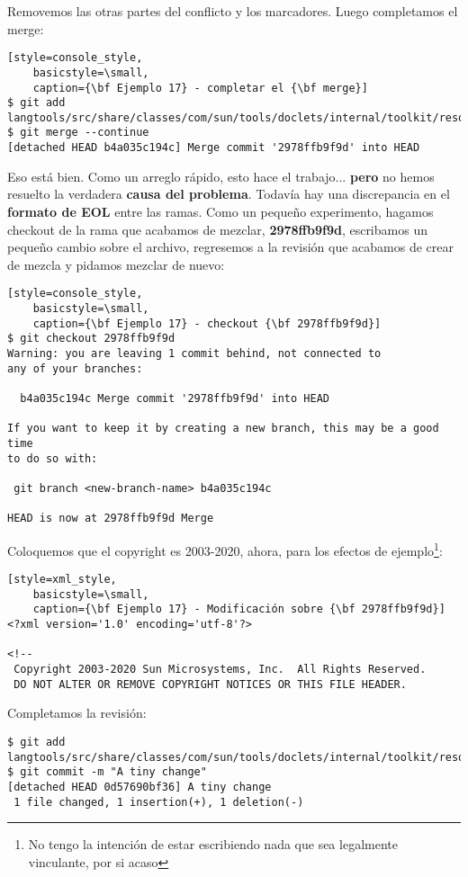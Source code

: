 Removemos las otras partes del conflicto y los marcadores. Luego completamos el merge:

\begin{lstlisting}[style=console_style,
	basicstyle=\small,
	caption={\bf Ejemplo 17} - completar el {\bf merge}]
$ git add langtools/src/share/classes/com/sun/tools/doclets/internal/toolkit/resources/doclet.xml
$ git merge --continue
[detached HEAD b4a035c194c] Merge commit '2978ffb9f9d' into HEAD
\end{lstlisting}

Eso está bien. Como un arreglo rápido, esto hace el trabajo... {\bf pero} no hemos resuelto la verdadera {\bf causa del problema}.
Todavía hay una discrepancia en el {\bf formato de EOL} entre las ramas. Como un pequeño experimento, hagamos checkout de la rama que
acabamos de mezclar, {\bf 2978ffb9f9d}, escribamos un pequeño cambio sobre el archivo, regresemos a la revisión que acabamos de crear de mezcla
y pidamos mezclar de nuevo:

\begin{lstlisting}[style=console_style,
	basicstyle=\small,
	caption={\bf Ejemplo 17} - checkout {\bf 2978ffb9f9d}]
$ git checkout 2978ffb9f9d
Warning: you are leaving 1 commit behind, not connected to
any of your branches:

  b4a035c194c Merge commit '2978ffb9f9d' into HEAD

If you want to keep it by creating a new branch, this may be a good time
to do so with:

 git branch <new-branch-name> b4a035c194c

HEAD is now at 2978ffb9f9d Merge
\end{lstlisting}

Coloquemos que el copyright es 2003-2020, ahora, para los efectos de ejemplo\footnote{No tengo la intención de estar escribiendo
nada que sea legalmente vinculante, por si acaso}:

\begin{lstlisting}[style=xml_style,
	basicstyle=\small,
	caption={\bf Ejemplo 17} - Modificación sobre {\bf 2978ffb9f9d}]
<?xml version='1.0' encoding='utf-8'?>

<!--
 Copyright 2003-2020 Sun Microsystems, Inc.  All Rights Reserved.
 DO NOT ALTER OR REMOVE COPYRIGHT NOTICES OR THIS FILE HEADER.
\end{lstlisting}

Completamos la revisión:

\begin{lstlisting}[style=console_style,
	basicstyle=\small,
	caption={\bf Ejemplo 17} -  creando una nueva revisión]
$ git add langtools/src/share/classes/com/sun/tools/doclets/internal/toolkit/resources/doclet.xml
$ git commit -m "A tiny change"
[detached HEAD 0d57690bf36] A tiny change
 1 file changed, 1 insertion(+), 1 deletion(-)
\end{lstlisting}

